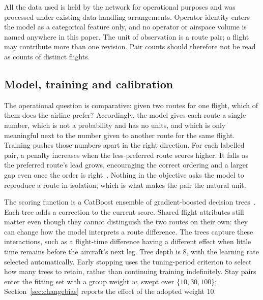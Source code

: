 \documentclass[conference,10pt,a4paper,IEEEoverridecommandlockouts]{IEEEtran}
\begin{document}
All the data used is held by the
network for operational purposes and was processed under existing
data-handling arrangements. Operator identity enters the model as a
categorical feature only, and no operator or airspace volume is named
anywhere in this paper. The unit of observation is a route pair; a flight
may contribute more than one revision. Pair counts should therefore not
be read as counts of distinct flights.


\subsection{Model, training and calibration}
\label{sec:proposals}

The operational question is comparative: given two routes for one flight,
which of them does the airline prefer? Accordingly, the model gives each
route a single number, which is not a probability and has no units, and which is only meaningful next to the number given to
another route for the same flight. Training pushes those numbers apart in the right direction. For each
labelled pair, a penalty increases when the less-preferred route scores
higher. It falls as the preferred route's lead grows, encouraging the
correct ordering and a larger gap even once the order is right~\cite{burges2005}. Nothing in the
objective asks the model to reproduce a route in isolation, which is what
makes the pair the natural unit.


The scoring function is a CatBoost ensemble of gradient-boosted decision
trees~\cite{prokhorenkova2017}. Each tree adds a correction to the
current score. Shared flight attributes still matter even though they
cannot distinguish the two routes on their own: they can change how the
model interprets a route difference. The trees capture these interactions, such as a flight-time
difference having a different effect when little time remains before
the aircraft's next leg. Tree depth is 8, with the learning rate
selected automatically. Early stopping uses the tuning-period criterion to select how many
trees to retain, rather than continuing training indefinitely. Stay
pairs enter the fitting set with a group weight $w$, swept over
$\{10, 30, 100\}$; Section~\ref{sec:changebias} reports the effect of the adopted weight 10.
\end{document}

